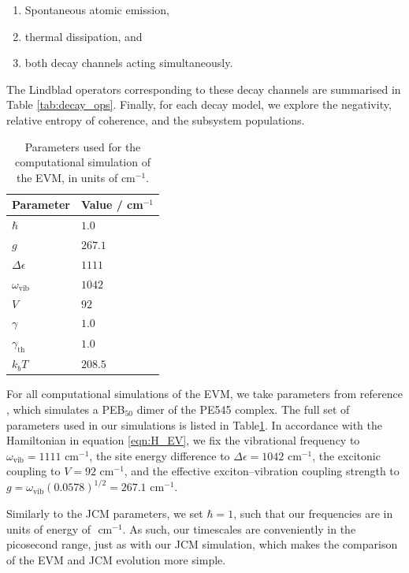 \documentclass[11pt]{article}
\begin{document}
\begin{enumerate}
    \item Spontaneous atomic emission, 
    \item thermal dissipation, and
    \item both decay channels acting simultaneously.
\end{enumerate}

The Lindblad operators corresponding to these decay channels are summarised in Table \ref{tab:decay_ops}. Finally, for each decay model, we explore the negativity, relative entropy of coherence, and the subsystem populations.

\begin{table}[h]
    \centering
    \caption{Parameters used for the computational simulation of the EVM, in units of cm$^{-1}$.}
    \begin{tabular}{l|l}
        \toprule
        \textbf{Parameter} & \textbf{Value / cm$^{-1}$} \\
        \midrule
        $\hbar$ & $1.0$ \\
        $g$ & $267.1$ \\
        $\Delta\epsilon$ & $1111$ \\
         $\omega_{\scriptscriptstyle \text{vib}}$ & $1042$ \\
        $V$ & $92$ \\
        $\gamma$ & $1.0$ \\
        $\gamma_{\scriptscriptstyle \text{th}}$ & $1.0$ \\
        $k_bT$ & $208.5$ \\
        \bottomrule
    \end{tabular}
    \label{tab:EVM_parameters}
\end{table}

\noindent For all computational simulations of the EVM, we take parameters from reference \cite{ExVib2014-Alexandra}, which simulates a PEB$_{50}$ dimer of the PE545 complex. The full set of parameters used in our simulations is listed in Table\ref{tab:EVM_parameters}. In accordance with the Hamiltonian in equation \eqref{eqn:H_EV}, we fix the vibrational frequency to $\omega_{\scriptscriptstyle \text{vib}} = 1111 \text{ cm}^{-1}$, the site energy difference to $\Delta\epsilon = 1042\text{ cm}^{-1}$, the excitonic coupling to $V = 92 \text{ cm}^{-1}$, and the effective exciton--vibration coupling strength to $g = \omega_{\scriptscriptstyle \text{vib}}(0.0578)^{1/2} = 267.1 \text{ cm}^{-1}.$ 

Similarly to the JCM parameters, we set $\hbar = 1$, such that our frequencies are in units of energy of $\text{ cm}^{-1}.$ As such, our timescales are conveniently in the picosecond range, just as with our JCM simulation, which makes the comparison of the EVM and JCM evolution more simple.
\end{document}

